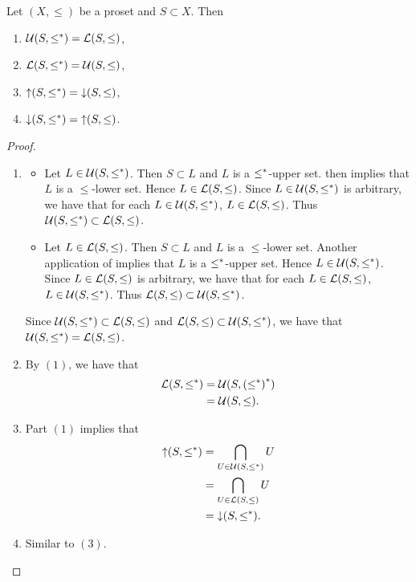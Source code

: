 \documentclass{book}
\begin{document}
	\begin{ex} 
		Let $(X, \leq)$ be a proset and $S \subset X$. Then 
		\begin{enumerate}
			\item $\mathcal{U}(S, \leq^*) = \mathcal{L}(S, \leq)$,
			\item $\mathcal{L}(S, \leq^*) = \mathcal{U}(S, \leq)$,
			\item $\operatorname{\uparrow} (S, \leq^*) = \operatorname{\downarrow}(S, \leq)$,
			\item $\operatorname{\downarrow} (S, \leq^*) = \operatorname{\uparrow}(S, \leq)$.
		\end{enumerate}
	\end{ex}
	
	\begin{proof}\
		\begin{enumerate}
			\item 
			\begin{itemize}
				\item Let $L \in \mathcal{U}(S, \leq^*)$. Then $S \subset L$ and $L$ is a $\leq^*$-upper set.  then implies that $L$ is a $\leq$-lower set. Hence $L \in \mathcal{L}(S, \leq)$. Since $L \in \mathcal{U}(S, \leq^*)$ is arbitrary, we have that for each $L \in \mathcal{U}(S, \leq^*)$, $L \in \mathcal{L}(S, \leq)$. Thus $\mathcal{U}(S, \leq^*) \subset \mathcal{L}(S, \leq)$.
				\item Let $L \in \mathcal{L}(S, \leq)$. Then $S \subset L$ and $L$ is a $\leq$-lower set. Another application of \rex{ex:ordered_sets:upper_lower_sets:intro:0003} implies that $L$ is a $\leq^*$-upper set. Hence $L \in \mathcal{U}(S, \leq^*)$. Since $L \in \mathcal{L}(S, \leq)$ is arbitrary, we have that for each $L \in \mathcal{L}(S, \leq)$, $L \in \mathcal{U}(S, \leq^*)$. Thus $\mathcal{L}(S, \leq) \subset \mathcal{U}(S, \leq^*)$.
			\end{itemize}
			Since $\mathcal{U}(S, \leq^*) \subset \mathcal{L}(S, \leq)$ and $\mathcal{L}(S, \leq) \subset \mathcal{U}(S, \leq^*)$, we have that $\mathcal{U}(S, \leq^*) = \mathcal{L}(S, \leq)$.
			\item By $(1)$, we have that 
			\begin{align*}
				\mathcal{L}(S, \leq^*)
				& = \mathcal{U}(S, {(\leq^*)}^*) \\ 
				& = \mathcal{U}(S, \leq).
			\end{align*}
			\item Part $(1)$ implies that
			\begin{align*}
				\operatorname{\uparrow} (S, \leq^*)
				& = \bigcap\limits_{U \in \mathcal{U}(S, \leq^*)} U \\
				& = \bigcap\limits_{U \in \mathcal{L}(S, \leq)} U \\
				& = \operatorname{\downarrow} (S, \leq^*).
			\end{align*}
			\item Similar to $(3)$.
		\end{enumerate}
	\end{proof}
	
\end{document}
